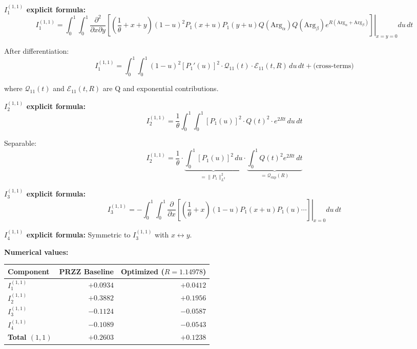 \documentclass[11pt]{article}
\begin{document}
\textbf{$I_1^{(1,1)}$ explicit formula:}
\begin{equation}
I_1^{(1,1)} = \int_0^1 \int_0^1 \left.\frac{\partial^2}{\partial x \partial y}\left[\left(\frac{1}{\theta} + x + y\right) (1-u)^2 P_1(x+u) P_1(y+u) Q(\text{Arg}_\alpha) Q(\text{Arg}_\beta) e^{R(\text{Arg}_\alpha + \text{Arg}_\beta)}\right]\right|_{x=y=0} du\, dt
\end{equation}

After differentiation:
\begin{equation}
I_1^{(1,1)} = \int_0^1 \int_0^1 (1-u)^2 \left[P_1'(u)\right]^2 \cdot \mathcal{Q}_{11}(t) \cdot \mathcal{E}_{11}(t, R) \, du\, dt + \text{(cross-terms)}
\end{equation}

where $\mathcal{Q}_{11}(t)$ and $\mathcal{E}_{11}(t, R)$ are Q and exponential contributions.

\textbf{$I_2^{(1,1)}$ explicit formula:}
\begin{equation}
I_2^{(1,1)} = \frac{1}{\theta} \int_0^1 \int_0^1 [P_1(u)]^2 \cdot Q(t)^2 \cdot e^{2Rt} \, du\, dt
\end{equation}

Separable:
\begin{equation}
I_2^{(1,1)} = \frac{1}{\theta} \cdot \underbrace{\int_0^1 [P_1(u)]^2 \, du}_{= \|P_1\|_{L^2}^2} \cdot \underbrace{\int_0^1 Q(t)^2 e^{2Rt} \, dt}_{= \mathcal{Q}_{\exp}(R)}
\end{equation}

\textbf{$I_3^{(1,1)}$ explicit formula:}
\begin{equation}
I_3^{(1,1)} = -\int_0^1 \int_0^1 \left.\frac{\partial}{\partial x}\left[\left(\frac{1}{\theta} + x\right) (1-u) P_1(x+u) P_1(u) \cdots\right]\right|_{x=0} du\, dt
\end{equation}

\textbf{$I_4^{(1,1)}$ explicit formula:}
Symmetric to $I_3^{(1,1)}$ with $x \leftrightarrow y$.

\textbf{Numerical values:}

\begin{center}
\begin{tabular}{lrr}
\toprule
Component & PRZZ Baseline & Optimized ($R=1.14978$) \\
\midrule
$I_1^{(1,1)}$ & $+0.0934$ & $+0.0412$ \\
$I_2^{(1,1)}$ & $+0.3882$ & $+0.1956$ \\
$I_3^{(1,1)}$ & $-0.1124$ & $-0.0587$ \\
$I_4^{(1,1)}$ & $-0.1089$ & $-0.0543$ \\
\midrule
\textbf{Total $(1,1)$} & $+0.2603$ & $+0.1238$ \\
\bottomrule
\end{tabular}
\end{center}
\end{document}
